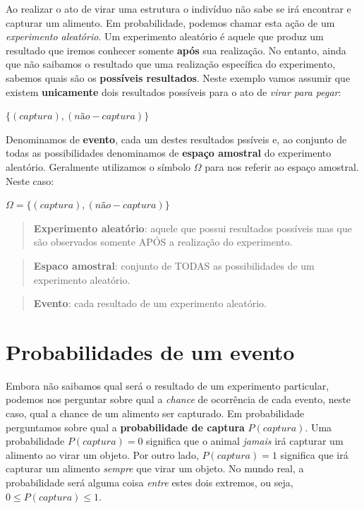 \documentclass[
]{book}
\begin{document}
Ao realizar o ato de virar uma estrutura o indivíduo não sabe se irá encontrar e capturar um alimento. Em probabilidade, podemos chamar esta ação de um \emph{experimento aleatório}. Um experimento aleatório é aquele que produz um resultado que iremos conhecer somente \textbf{após} sua realização. No entanto, ainda que não saibamos o resultado que uma realização específica do experimento, sabemos quais são os \textbf{possíveis resultados}. Neste exemplo vamos assumir que existem \textbf{unicamente} dois resultados possíveis para o ato de \emph{virar para pegar}:

\(\{(captura), (não-captura)\}\)

Denominamos de \textbf{evento}, cada um destes resultados pssíveis e, ao conjunto de todas as possibilidades denominamos de \textbf{espaço amostral} do experimento aleatório. Geralmente utilizamos o símbolo \(\Omega\) para nos referir ao espaço amostral. Neste caso:

\(\Omega = \{(captura), (não-captura)\}\)

\begin{quote}
\textbf{Experimento aleatório}: aquele que possui resultados possíveis mas que são observados somente APÓS a realização do experimento.
\end{quote}

\begin{quote}
\textbf{Espaco amostral}: conjunto de TODAS as possibilidades de um experimento aleatório.
\end{quote}

\begin{quote}
\textbf{Evento}: cada resultado de um experimento aleatório.
\end{quote}

\hypertarget{probabilidades-de-um-evento}{%
\section{Probabilidades de um evento}\label{probabilidades-de-um-evento}}

Embora não saibamos qual será o resultado de um experimento particular, podemos nos perguntar sobre qual a \emph{chance} de ocorrência de cada evento, neste caso, qual a chance de um alimento ser capturado. Em probabilidade perguntamos sobre qual a \textbf{probabilidade de captura} \(P(captura)\). Uma probabilidade \(P(captura) = 0\) significa que o animal \emph{jamais} irá capturar um alimento ao virar um objeto. Por outro lado, \(P(captura) = 1\) significa que irá capturar um alimento \emph{sempre} que virar um objeto. No mundo real, a probabilidade será alguma coisa \emph{entre} estes dois extremos, ou seja, \(0 \le P(captura) \le 1\).
\end{document}
